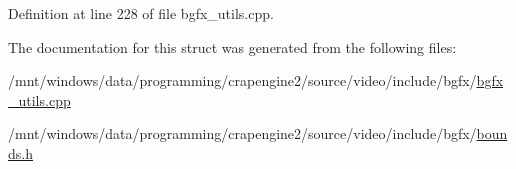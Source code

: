 Definition at line 228 of file bgfx\+\_\+utils.\+cpp.



The documentation for this struct was generated from the following files\+:\begin{DoxyCompactItemize}
\item 
/mnt/windows/data/programming/crapengine2/source/video/include/bgfx/\hyperlink{bgfx__utils_8cpp}{bgfx\+\_\+utils.\+cpp}\item 
/mnt/windows/data/programming/crapengine2/source/video/include/bgfx/\hyperlink{bounds_8h}{bounds.\+h}\end{DoxyCompactItemize}

